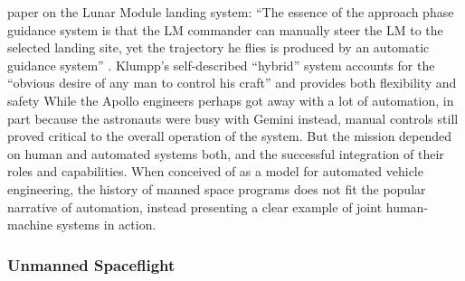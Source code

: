 paper on the Lunar Module landing system: ``The essence of the
approach phase guidance system is that the LM commander can manually
steer the LM to the selected landing site, yet the trajectory he flies
is produced by an automatic guidance system'' \cite[p.
  129]{???-Klumpp}. Klumpp's self-described ``hybrid'' system accounts 
for the ``obvious desire of any man to control his craft'' and
provides both flexibility and safety\cite[p. 129-130]{???-Klumpp}
While the Apollo engineers perhaps
got away with a lot of automation, in part because the astronauts were
busy with Gemini instead, manual controls still proved critical to the
overall operation of the system. But the mission depended on human and
automated systems both, and the successful integration of their roles
and capabilities. When conceived of as a model for automated vehicle
engineering, the history of manned space programs does not fit the
popular narrative of automation, instead presenting a clear example of
joint human-machine systems in action.

\subsubsection{Unmanned Spaceflight}

